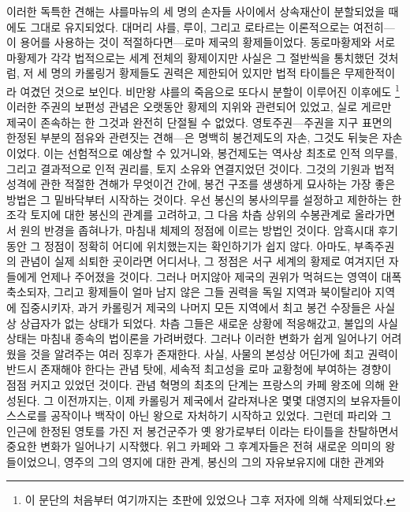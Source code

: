 이러한 독특한 견해는 샤를마뉴의 세 명의 손자들 사이에서
상속재산이 분할되었을 때에도 그대로 유지되었다.
대머리 샤를, 루이, 그리고 로타르는 이론적으로는 여전히---이 용어를
사용하는 것이 적절하다면---로마 제국의 황제들이었다.
동로마황제와 서로마황제가 각각 법적으로는 세계 전체의 황제이지만
사실은 그 절반씩을 통치했던 것처럼,
저 세 명의 카롤링거 황제들도 권력은 제한되어 있지만
법적 타이틀은 무제한적이라 여겼던 것으로 보인다.
비만왕 샤를의 죽음으로 또다시 분할이 이루어진 이후에도
\footnote{이 문단의 처음부터 여기까지는 초판에 있었으나 그후 저자에 의해 삭제되었다.}
이러한 주권의 보편성 관념은
오랫동안 황제의 지위와 관련되어 있었고,
실로 게르만 제국이 존속하는 한 그것과 완전히 단절될 수 없었다.
영토주권---주권을 지구 표면의 한정된 부분의 점유와 관련짓는 견해---은
명백히 봉건제도의 자손, 그것도 뒤늦은 자손이었다.
이는 선험적으로 예상할 수 있거니와,
봉건제도는 역사상 최초로 인적 의무를, 그리고 결과적으로
인적 권리를, 토지 소유와 연결지었던 것이다.
그것의 기원과 법적 성격에 관한 적절한 견해가 무엇이건 간에,
봉건 구조를 생생하게 묘사하는 가장 좋은 방법은
그 밑바닥부터 시작하는 것이다.
우선 봉신의 봉사의무를 설정하고 제한하는 한 조각 토지에 대한
봉신의 관계를 고려하고,
그 다음 차츰 상위의 수봉관계로 올라가면서 원의 반경을 좁혀나가,
마침내 체제의 정점에 이르는 방법인 것이다.
암흑시대 후기 동안 그 정점이 정확히 어디에 위치했는지는 확인하기가 쉽지 않다.
아마도, 부족주권의 관념이 실제 쇠퇴한 곳이라면 어디서나,
그 정점은 서구 세계의 황제로 여겨지던 자들에게 언제나 주어졌을 것이다.
그러나 머지않아 제국의 권위가 먹혀드는 영역이 대폭 축소되자,
그리고 황제들이 얼마 남지 않은 그들 권력을
독일 지역과 북이탈리아 지역에 집중시키자,
과거 카롤링거 제국의 나머지 모든 지역에서 최고 봉건 수장들은 사실상
상급자가 없는 상태가 되었다.
차츰 그들은 새로운 상황에 적응해갔고,
불입의 사실상태는
마침내 종속의 법이론을 가려버렸다.
그러나 이러한 변화가 쉽게 일어나기 어려웠을 것을 알려주는 여러 징후가 존재한다.
사실, 사물의 본성상 어딘가에 최고 권력이 반드시 존재해야 한다는 관념 탓에,
세속적 최고성을 로마 교황청에 부여하는 경향이 점점 커지고 있었던 것이다.
관념 혁명의 최초의 단계는
프랑스의 카페 왕조에 의해 완성된다.
그 이전까지는,
이제 카롤링거 제국에서 갈라져나온 몇몇 대영지의 보유자들이
스스로를 공작이나 백작이 아닌 왕으로 자처하기 시작하고 있었다.
그런데 파리와 그 인근에 한정된 영토를 가진 저 봉건군주가
옛 왕가로부터 이라는 타이틀을 찬탈하면서
중요한 변화가 일어나기 시작했다.
위그 카페와 그 후계자들은 전혀 새로운 의미의 왕들이었으니,
영주의 그의 영지에 대한 관계, 봉신의 그의 자유보유지에 대한 관계와
